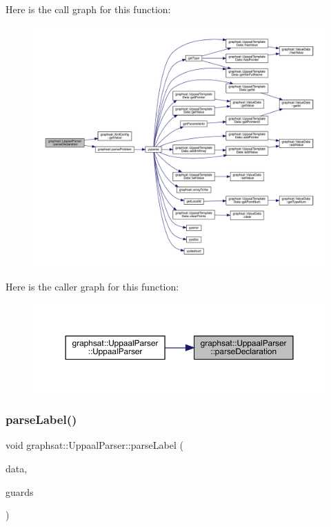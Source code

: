 Here is the call graph for this function\+:
\nopagebreak
\begin{figure}[H]
\begin{center}
\leavevmode
\includegraphics[width=350pt]{classgraphsat_1_1_uppaal_parser_a5234eff5f12d53358893072e421fb108_cgraph}
\end{center}
\end{figure}
Here is the caller graph for this function\+:
\nopagebreak
\begin{figure}[H]
\begin{center}
\leavevmode
\includegraphics[width=350pt]{classgraphsat_1_1_uppaal_parser_a5234eff5f12d53358893072e421fb108_icgraph}
\end{center}
\end{figure}
\mbox{\label{classgraphsat_1_1_uppaal_parser_a33d35bb79055b36cf00b281a63265a41}} 
\subsubsection{\texorpdfstring{parseLabel()}{parseLabel()}}
{\footnotesize\ttfamily void graphsat\+::\+Uppaal\+Parser\+::parse\+Label (\begin{DoxyParamCaption}\item[{\mbox{\hyperlink{classgraphsat_1_1_uppaal_template_data}{Uppaal\+Template\+Data}} \&}]{data,  }\item[{string}]{guards }\end{DoxyParamCaption})\hspace{0.3cm}{\ttfamily [private]}}

